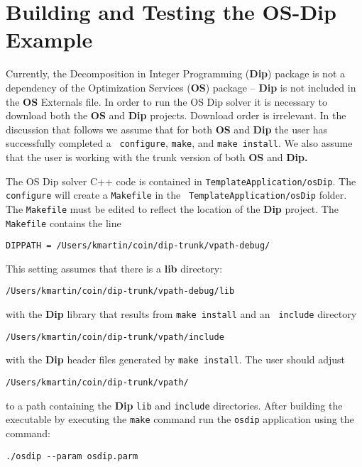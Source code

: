 \documentclass[11pt]{article}
\begin{document}
\section{Building and Testing the OS-Dip Example}\label{section:build}

Currently, the Decomposition in Integer Programming ({\bf Dip}) package is not a
dependency of the Optimization Services ({\bf OS}) package -- {\bf Dip} is not
included in the {\bf OS} Externals file. In order to run the OS Dip solver it is
necessary to download both the {\bf OS} and {\bf  Dip} projects. Download order is irrelevant. 
In the discussion that follows we assume that for both 
{\bf OS} and {\bf Dip} the user has successfully completed a {\tt
configure}, {\tt make}, and {\tt make install}. We also assume
that the user is working with the trunk version of both {\bf OS} and {\bf Dip.}


The OS Dip solver C++ code is contained in {\tt TemplateApplication/osDip}.
 The {\tt configure}  will create a {\tt Makefile}  in the {\tt
 TemplateApplication/osDip} folder. The {\tt Makefile} must be edited to reflect
 the location of the {\bf Dip} project. The {\tt Makefile} contains the
 line

\begin{verbatim}
DIPPATH = /Users/kmartin/coin/dip-trunk/vpath-debug/
\end{verbatim}

This setting assumes that there is a {\bf lib} directory:

\begin{verbatim}
/Users/kmartin/coin/dip-trunk/vpath-debug/lib
\end{verbatim}
with the {\bf Dip} library that results from {\tt make install} and an {\tt
include} directory
\begin{verbatim}
/Users/kmartin/coin/dip-trunk/vpath/include
\end{verbatim}
with the {\bf Dip} header files generated by {\tt make install}.  The user
should adjust
\begin{verbatim}
/Users/kmartin/coin/dip-trunk/vpath/
\end{verbatim}
to a path containing the {\bf Dip} {\tt lib} and {\tt include} directories. 
After building the executable by executing the {\tt make} command run the {\tt osdip} application using the command:

\begin{verbatim}
./osdip --param osdip.parm
\end{verbatim}
\end{document}
